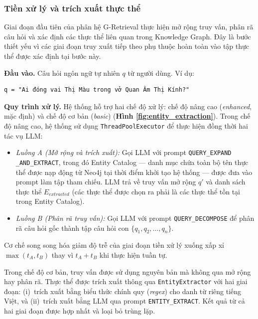 \subsubsection{Tiền xử lý và trích xuất thực thể}

Giai đoạn đầu tiên của phân hệ G-Retrieval thực hiện mở rộng truy vấn, phân rã câu hỏi và xác định các thực thể liên quan trong Knowledge Graph. Đây là bước thiết yếu vì các giai đoạn truy xuất tiếp theo phụ thuộc hoàn toàn vào tập thực thể được xác định tại bước này.

\textbf{Đầu vào.} Câu hỏi ngôn ngữ tự nhiên $q$ từ người dùng. Ví dụ:

\begin{tcolorbox}[colback=gray!5, colframe=black!50, arc=4pt, boxrule=0.5pt]
{\small
\begin{verbatim}
q = "Ai đóng vai Thị Màu trong vở Quan Âm Thị Kính?"
\end{verbatim}
}
\end{tcolorbox}

\textbf{Quy trình xử lý.} Hệ thống hỗ trợ hai chế độ xử lý: chế độ nâng cao (\textit{enhanced}, mặc định) và chế độ cơ bản (\textit{basic}) (\textbf{Hình \ref{fig:entity_extraction}}). Trong chế độ nâng cao, hệ thống sử dụng \texttt{ThreadPoolExecutor} để thực hiện đồng thời hai tác vụ LLM:

\begin{itemize}
  \item \textit{Luồng A (Mở rộng và trích xuất):} Gọi LLM với prompt \texttt{QUERY\_EXPAND \\ \_AND\_EXTRACT}, trong đó Entity Catalog --- danh mục chứa toàn bộ tên thực thể được nạp động từ Neo4j tại thời điểm khởi tạo hệ thống --- được đưa vào prompt làm tập tham chiếu. LLM trả về truy vấn mở rộng $q'$ và danh sách thực thể $E_{extracted}$ (các thực thể được chọn ra phải là các thực thể tồn tại trong Entity Catalog).
  \item \textit{Luồng B (Phân rã truy vấn):} Gọi LLM với prompt \texttt{QUERY\_DECOMPOSE} để phân rã câu hỏi gốc thành tập câu hỏi con $\{q_1, q_2, \ldots, q_n\}$.
\end{itemize}

Cơ chế song song hóa giảm độ trễ của giai đoạn tiền xử lý xuống xấp xỉ $\max(t_A, t_B)$ thay vì $t_A + t_B$ khi thực hiện tuần tự.

Trong chế độ cơ bản, truy vấn được sử dụng nguyên bản mà không qua mở rộng hay phân rã. Thực thể được trích xuất thông qua \texttt{EntityExtractor} với hai giai đoạn: (i)~trích xuất bằng biểu thức chính quy (\textit{regex}) cho danh từ riêng tiếng Việt, và (ii)~trích xuất bằng LLM qua prompt \texttt{ENTITY\_EXTRACT}. Kết quả từ cả hai giai đoạn được hợp nhất và loại bỏ trùng lặp.

